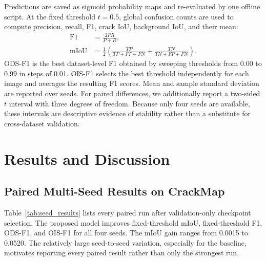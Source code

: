 \documentclass[preprint,12pt]{elsarticle}
\begin{document}
Predictions are saved as sigmoid probability maps and re-evaluated by one offline script. At the fixed threshold $t=0.5$, global confusion counts are used to compute precision, recall, F1, crack IoU, background IoU, and their mean:
\begin{align}
\mathrm{F1} &= \frac{2PR}{P+R}, \\
\mathrm{mIoU} &= \frac{1}{2}\left(
\frac{TP}{TP+FP+FN}+\frac{TN}{TN+FP+FN}\right).
\end{align}
ODS-F1 is the best dataset-level F1 obtained by sweeping thresholds from 0.00 to 0.99 in steps of 0.01. OIS-F1 selects the best threshold independently for each image and averages the resulting F1 scores. Mean and sample standard deviation are reported over seeds. For paired differences, we additionally report a two-sided $t$ interval with three degrees of freedom. Because only four seeds are available, these intervals are descriptive evidence of stability rather than a substitute for cross-dataset validation.

\section{Results and Discussion}
\label{sec:results}

\subsection{Paired Multi-Seed Results on CrackMap}

Table~\ref{tab:seed_results} lists every paired run after validation-only checkpoint selection. The proposed model improves fixed-threshold mIoU, fixed-threshold F1, ODS-F1, and OIS-F1 for all four seeds. The mIoU gain ranges from 0.0015 to 0.0520. The relatively large seed-to-seed variation, especially for the baseline, motivates reporting every paired result rather than only the strongest run.
\end{document}
